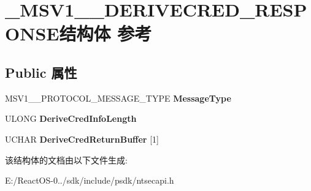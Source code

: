 \hypertarget{struct___m_s_v1__0___d_e_r_i_v_e_c_r_e_d___r_e_s_p_o_n_s_e}{}\section{\+\_\+\+M\+S\+V1\+\_\+\_\+\+D\+E\+R\+I\+V\+E\+C\+R\+E\+D\+\_\+\+R\+E\+S\+P\+O\+N\+S\+E结构体 参考}
\label{struct___m_s_v1__0___d_e_r_i_v_e_c_r_e_d___r_e_s_p_o_n_s_e}
\subsection*{Public 属性}
\begin{DoxyCompactItemize}
\item 
\mbox{\label{struct___m_s_v1__0___d_e_r_i_v_e_c_r_e_d___r_e_s_p_o_n_s_e_ae8615576cac8daa6724f5a2233f03879}} 
M\+S\+V1\+\_\+\_\+\+P\+R\+O\+T\+O\+C\+O\+L\+\_\+\+M\+E\+S\+S\+A\+G\+E\+\_\+\+T\+Y\+PE {\bfseries Message\+Type}
\item 
\mbox{\label{struct___m_s_v1__0___d_e_r_i_v_e_c_r_e_d___r_e_s_p_o_n_s_e_ac21999e3de255b0af77cd234934caa12}} 
U\+L\+O\+NG {\bfseries Derive\+Cred\+Info\+Length}
\item 
\mbox{\label{struct___m_s_v1__0___d_e_r_i_v_e_c_r_e_d___r_e_s_p_o_n_s_e_af45e08c7072cafd43af8ccdd55de250a}} 
U\+C\+H\+AR {\bfseries Derive\+Cred\+Return\+Buffer} \mbox{[}1\mbox{]}
\end{DoxyCompactItemize}


该结构体的文档由以下文件生成\+:\begin{DoxyCompactItemize}
\item 
E\+:/\+React\+O\+S-\/0../sdk/include/psdk/ntsecapi.\+h\end{DoxyCompactItemize}
